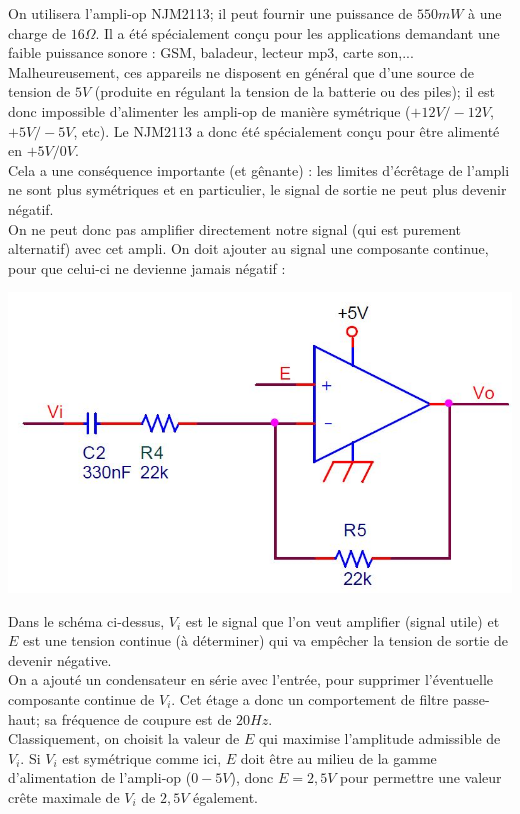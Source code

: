 On utilisera l'ampli-op NJM2113; il peut fournir une puissance de $550mW$ à une charge de $16\Omega$. Il a été spécialement conçu pour les applications demandant une faible puissance sonore : GSM, baladeur, lecteur mp3, carte son,...\\
Malheureusement, ces appareils ne disposent en général que d'une source de tension de $5V$ (produite en régulant la tension de la batterie ou des piles); il est donc impossible d'alimenter les ampli-op de manière symétrique ($+12V/-12V$, $+5V/-5V$, etc). Le NJM2113 a donc été spécialement conçu pour être alimenté en
$+5V/0V$.\\
Cela a une conséquence importante (et gênante) : les limites d'écrêtage de l'ampli ne sont plus symétriques et en particulier, le signal de sortie ne peut plus devenir négatif.\\
On ne peut donc pas amplifier directement notre signal (qui est purement alternatif) avec cet ampli. On doit ajouter au signal une composante continue, pour que celui-ci ne devienne jamais négatif :
\begin{center}
\includegraphics[scale=0.4]{polarisation.JPG}
\label{polarisation}
\end{center}

Dans le schéma ci-dessus, $V_i$ est le signal que l'on veut amplifier (signal utile) et $E$ est une tension continue (à déterminer) qui va empêcher la tension de sortie de devenir négative.\\
On a ajouté un condensateur en série avec l'entrée, pour supprimer l'éventuelle composante continue de $V_i$. Cet étage a donc un comportement de filtre passe-haut; sa fréquence de coupure est de $20Hz$.\\
Classiquement, on choisit la valeur de $E$ qui maximise l'amplitude admissible de $V_i$. Si $V_i$ est symétrique comme ici, $E$ doit être au milieu de la gamme d'alimentation de l'ampli-op ($0-5V$), donc $E = 2,5V$ pour permettre une valeur crête maximale de $V_i$ de $2,5V$ également.

